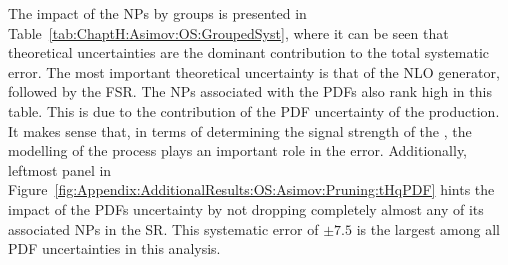 The impact of the NPs by groups is presented in Table~\ref{tab:ChaptH:Asimov:OS:GroupedSyst},
where it can be seen that theoretical uncertainties are the dominant contribution to the total systematic
error. The most important theoretical uncertainty is that of the \ttbar NLO generator, followed
by the \ttbar FSR.
The NPs associated with the PDFs also rank high in this table. This is due to the contribution
of the PDF uncertainty of the \tHq production.
It makes sense that, in terms of determining the signal strength of the \tHq, the modelling of the 
\tHq process plays an important role in the error.
Additionally, leftmost panel in Figure~\ref{fig:Appendix:AdditionalResults:OS:Asimov:Pruning:tHqPDF} hints the  impact of the \tHq PDFs uncertainty by not dropping completely almost any of its associated NPs in the SR. This systematic error of $\pm 7.5$ is the largest among all PDF uncertainties in this analysis.



